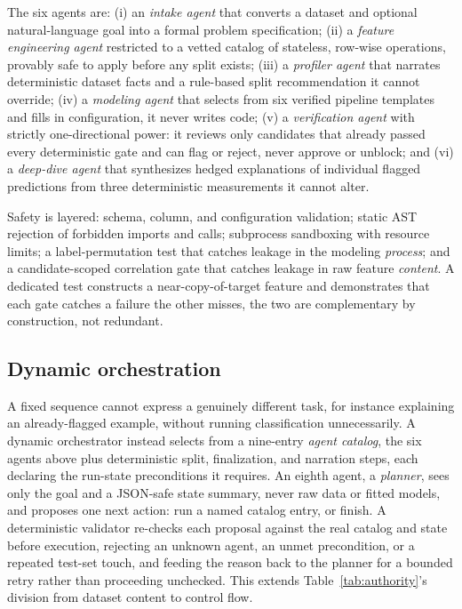 \documentclass[5p,times]{elsarticle}
\begin{document}
The six agents are: (i) an \emph{intake agent} that converts a dataset and optional natural-language goal into a formal problem specification; (ii) a \emph{feature engineering agent} restricted to a vetted catalog of stateless, row-wise operations, provably safe to apply before any split exists; (iii) a \emph{profiler agent} that narrates deterministic dataset facts and a rule-based split recommendation it cannot override; (iv) a \emph{modeling agent} that selects from six verified pipeline templates and fills in configuration, it never writes code; (v) a \emph{verification agent} with strictly one-directional power: it reviews only candidates that already passed every deterministic gate and can flag or reject, never approve or unblock; and (vi) a \emph{deep-dive agent} that synthesizes hedged explanations of individual flagged predictions from three deterministic measurements it cannot alter.

Safety is layered: schema, column, and configuration validation; static AST rejection of forbidden imports and calls; subprocess sandboxing with resource limits; a label-permutation test that catches leakage in the modeling \emph{process}; and a candidate-scoped correlation gate that catches leakage in raw feature \emph{content}. A dedicated test constructs a near-copy-of-target feature and demonstrates that each gate catches a failure the other misses, the two are complementary by construction, not redundant.

\subsection{Dynamic orchestration}
\label{sec:dynamic}
A fixed sequence cannot express a genuinely different task, for instance explaining an already-flagged example, without running classification unnecessarily. A dynamic orchestrator instead selects from a nine-entry \emph{agent catalog}, the six agents above plus deterministic split, finalization, and narration steps, each declaring the run-state preconditions it requires. An eighth agent, a \emph{planner}, sees only the goal and a JSON-safe state summary, never raw data or fitted models, and proposes one next action: run a named catalog entry, or finish. A deterministic validator re-checks each proposal against the real catalog and state before execution, rejecting an unknown agent, an unmet precondition, or a repeated test-set touch, and feeding the reason back to the planner for a bounded retry rather than proceeding unchecked. This extends Table~\ref{tab:authority}'s division from dataset content to control flow.
\end{document}
